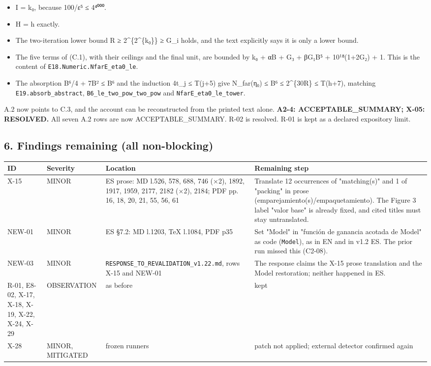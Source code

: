 \documentclass[
]{article}
\newcounter{none} %
\providecommand{\tightlist}{%
  \setlength{\itemsep}{0pt}\setlength{\parskip}{0pt}}
\begin{document}
\begin{itemize}
\tightlist
\item
  I = k₀, because 100/ε⁵ ≤ 4⁴⁰⁰⁰.
\item
  H = h exactly.
\item
  The two-iteration lower bound R ≥ 2\^{}\{2\^{}\{k₀\}\} ≥ G\_i holds,
  and the text explicitly says it is only a lower bound.
\item
  The five terms of (C.1), with their ceilings and the final unit, are
  bounded by k₀ + αB + G₃ + βG₁B⁵ + 10¹⁸(1+2G₂) + 1. This is the content
  of \texttt{E18.Numeric.NfarE\_eta0\_le}.
\item
  The absorption B⁶/4 + 7B² ≤ B⁶ and the induction 4t\_j ≤ T(j+5) give
  N\_far(η₀) ≤ B⁶ ≤ 2\^{}\{30R\} ≤ T(h+7), matching
  \texttt{E19.absorb\_abstract}, \texttt{B6\_le\_two\_pow\_two\_pow} and
  \texttt{NfarE\_eta0\_le\_tower}.
\end{itemize}

A.2 now points to C.3, and the account can be reconstructed from the
printed text alone. \textbf{A2-4: ACCEPTABLE\_SUMMARY; X-05: RESOLVED.}
All seven A.2 rows are now ACCEPTABLE\_SUMMARY. R-02 is resolved. R-01
is kept as a declared expository limit.

\subsection{6. Findings remaining (all
non-blocking)}\label{6-findings-remaining-all-non-blocking}

{\def\LTcaptype{none} %
\begin{longtable}[]{@{}llll@{}}
\toprule\noalign{}
ID & Severity & Location & Remaining step \\
\midrule\noalign{}
\endhead
\bottomrule\noalign{}
\endlastfoot
X-15 & MINOR & ES prose: MD l.526, 578, 688, 746 (×2), 1892, 1917, 1959,
2177, 2182 (×2), 2184; PDF pp. 16, 18, 20, 21, 55, 56, 61 & Translate 12
occurrences of "matching(s)" and 1 of "packing" in prose
(emparejamiento(s)/empaquetamiento). The Figure 3 label "valor base" is
already fixed, and cited titles must stay untranslated. \\
NEW-01 & MINOR & ES §7.2: MD l.1203, TeX l.1084, PDF p35 & Set "Model"
in "función de ganancia acotada de Model" as code
(\texttt{\textasciigrave{}Model\textasciigrave{}}), as in EN and in v1.2
ES. The prior run missed this (C2-08). \\
NEW-03 & MINOR & \texttt{RESPONSE\_TO\_REVALIDATION\_v1.22.md}, rows
X-15 and NEW-01 & The response claims the X-15 prose translation and the
Model restoration; neither happened in ES. \\
R-01, E8-02, X-17, X-18, X-19, X-22, X-24, X-29 & OBSERVATION & as
before & kept \\
X-28 & MINOR, MITIGATED & frozen runners & patch not applied; external
detector confirmed again \\
\end{longtable}
}
\end{document}
